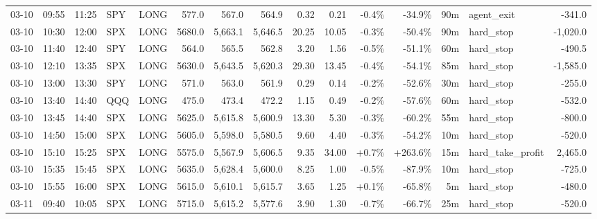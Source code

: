 \documentclass[11pt,a4paper,twoside]{article}
\begin{document}
\begin{landscape}
\begin{center}
\begin{longtable}{>{\color{txtmain}}l l l l l r r r r r r r r >{\color{txtmain}}l r}
03-10 & 09:55 & 11:25 & SPY & LONG & 577.0 & 567.0 & 564.9 & 0.32 & 0.21 & \textcolor{lossred}{-0.4\%} & \textcolor{lossred}{-34.9\%} & 90m & agent\_exit & \textcolor{lossred}{-341.0} \\
03-10 & 10:30 & 12:00 & SPX & LONG & 5680.0 & 5,663.1 & 5,646.5 & 20.25 & 10.05 & \textcolor{lossred}{-0.3\%} & \textcolor{lossred}{-50.4\%} & 90m & hard\_stop & \textcolor{lossred}{-1,020.0} \\
03-10 & 11:40 & 12:40 & SPY & LONG & 564.0 & 565.5 & 562.8 & 3.20 & 1.56 & \textcolor{lossred}{-0.5\%} & \textcolor{lossred}{-51.1\%} & 60m & hard\_stop & \textcolor{lossred}{-490.5} \\
03-10 & 12:10 & 13:35 & SPX & LONG & 5630.0 & 5,643.5 & 5,620.3 & 29.30 & 13.45 & \textcolor{lossred}{-0.4\%} & \textcolor{lossred}{-54.1\%} & 85m & hard\_stop & \textcolor{lossred}{-1,585.0} \\
03-10 & 13:00 & 13:30 & SPY & LONG & 571.0 & 563.0 & 561.9 & 0.29 & 0.14 & \textcolor{lossred}{-0.2\%} & \textcolor{lossred}{-52.6\%} & 30m & hard\_stop & \textcolor{lossred}{-255.0} \\
03-10 & 13:40 & 14:40 & QQQ & LONG & 475.0 & 473.4 & 472.2 & 1.15 & 0.49 & \textcolor{lossred}{-0.2\%} & \textcolor{lossred}{-57.6\%} & 60m & hard\_stop & \textcolor{lossred}{-532.0} \\
03-10 & 13:45 & 14:40 & SPX & LONG & 5625.0 & 5,615.8 & 5,600.9 & 13.30 & 5.30 & \textcolor{lossred}{-0.3\%} & \textcolor{lossred}{-60.2\%} & 55m & hard\_stop & \textcolor{lossred}{-800.0} \\
03-10 & 14:50 & 15:00 & SPX & LONG & 5605.0 & 5,598.0 & 5,580.5 & 9.60 & 4.40 & \textcolor{lossred}{-0.3\%} & \textcolor{lossred}{-54.2\%} & 10m & hard\_stop & \textcolor{lossred}{-520.0} \\
03-10 & 15:10 & 15:25 & SPX & LONG & 5575.0 & 5,567.9 & 5,606.5 & 9.35 & 34.00 & \textcolor{wingreen}{+0.7\%} & \textcolor{wingreen}{+263.6\%} & 15m & hard\_take\_profit & \textcolor{wingreen}{2,465.0} \\
03-10 & 15:35 & 15:45 & SPX & LONG & 5635.0 & 5,628.4 & 5,600.0 & 8.25 & 1.00 & \textcolor{lossred}{-0.5\%} & \textcolor{lossred}{-87.9\%} & 10m & hard\_stop & \textcolor{lossred}{-725.0} \\
03-10 & 15:55 & 16:00 & SPX & LONG & 5615.0 & 5,610.1 & 5,615.7 & 3.65 & 1.25 & \textcolor{wingreen}{+0.1\%} & \textcolor{lossred}{-65.8\%} & 5m & hard\_stop & \textcolor{lossred}{-480.0} \\
03-11 & 09:40 & 10:05 & SPX & LONG & 5715.0 & 5,615.2 & 5,577.6 & 3.90 & 1.30 & \textcolor{lossred}{-0.7\%} & \textcolor{lossred}{-66.7\%} & 25m & hard\_stop & \textcolor{lossred}{-520.0} \\

\end{longtable}
\end{center}
\end{landscape}
\end{document}
